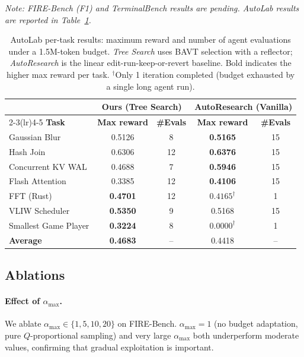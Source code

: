 \documentclass{article}
\begin{document}
\textit{Note: FIRE-Bench (F1) and TerminalBench results are pending. AutoLab results are reported in Table~\ref{tab:autolab}.}

\begin{table}[t]
\centering
\caption{AutoLab per-task results: maximum reward and number of agent evaluations under a 1.5M-token budget.
\emph{Tree Search} uses BAVT selection with a reflector; \emph{AutoResearch} is the linear edit-run-keep-or-revert baseline.
Bold indicates the higher max reward per task.
$^\dagger$Only 1 iteration completed (budget exhausted by a single long agent run).}
\label{tab:autolab}
\setlength{\tabcolsep}{6pt}
\begin{tabular}{lcccc}
\toprule
 & \multicolumn{2}{c}{\textbf{Ours (Tree Search)}} & \multicolumn{2}{c}{\textbf{AutoResearch (Vanilla)}} \\
\cmidrule(lr){2-3}\cmidrule(lr){4-5}
\textbf{Task} & \textbf{Max reward} & \textbf{\#Evals} & \textbf{Max reward} & \textbf{\#Evals} \\
\midrule
Gaussian Blur        & 0.5126          &  8 & \textbf{0.5165} & 15 \\
Hash Join            & 0.6306          & 12 & \textbf{0.6376} & 15 \\
Concurrent KV WAL    & 0.4688          &  7 & \textbf{0.5946} & 15 \\
Flash Attention      & 0.3385          & 12 & \textbf{0.4106} & 15 \\
FFT (Rust)           & \textbf{0.4701} & 12 & $0.4165^\dagger$ &  1 \\
VLIW Scheduler       & \textbf{0.5350} &  9 & 0.5168          & 15 \\
Smallest Game Player & \textbf{0.3224} &  8 & $0.0000^\dagger$ &  1 \\
\midrule
\textbf{Average}     & \textbf{0.4683} & -- & 0.4418          & -- \\
\bottomrule
\end{tabular}
\end{table}

\subsection{Ablations}

\paragraph{Effect of $\alpha_{\max}$.}
We ablate $\alpha_{\max} \in \{1, 5, 10, 20\}$ on FIRE-Bench.
$\alpha_{\max}=1$ (no budget adaptation, pure $Q$-proportional sampling) and very large $\alpha_{\max}$ both underperform moderate values, confirming that gradual exploitation is important.
\end{document}
